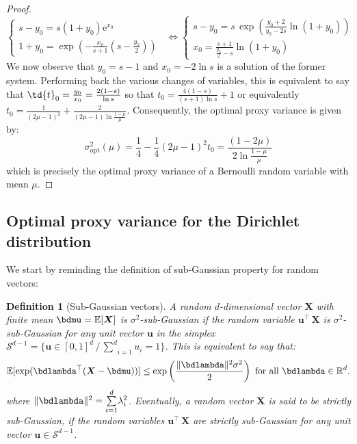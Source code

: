 \documentclass[15pt]{article}
\newcommand{\R}{\mathbb{R}}
\newcommand{\E}{\mathbb{E}}
\newcommand{\edr}{\mathrm{e}}
\def\E{\mathbb{E}}
\theoremstyle{plain}
\newtheorem{defi}{{Definition}}%
\begin{document}
\begin{proof}
\begin{equation*} 
\left\{\begin{array}{l}
 s-y_0=s(1+y_0)\edr^{x_0} \\  
 1+y_0=\exp\left(-\frac{x_0}{s+1}\left(s-\frac{y_0}{2}\right)\right)
\end{array}
\right. \,\,\,\Leftrightarrow  \left\{\begin{array}{l}
 s-y_0=s\,\exp\left(\frac{y_0+2}{y_0-2s}\ln(1+y_0)\right) \\  
 x_0=\frac{s+1}{\frac{y_0}{2}-s}\ln(1+y_0)
\end{array}
\right.
\end{equation*}
We now observe that $y_0=s-1$ and $x_0=-2\ln s$ is a solution of the former system. Performing back the various changes of variables, this is equivalent to say that $\td{t}_0=\frac{y_0}{x_0}= \frac{2(1-s)}{\ln s}$ so that $t_0=\frac{4(1-s)}{(s+1)\ln s}+1$ or equivalently $t_0=\frac{1}{(2\mu-1)^2}+\frac{2}{(2\mu-1)\ln\frac{1-\mu}{\mu}}$. Consequently, the optimal proxy variance is given by:
\begin{equation*} 
\sigma_{\text{opt}}^2(\mu)=\frac{1}{4}-\frac{1}{4}(2\mu-1)^2t_0=\frac{(1-2\mu)}{2\ln \frac{1-\mu}{\mu}}
\end{equation*}
which is precisely the optimal proxy variance of a Bernoulli random variable with mean $\mu$.
\end{proof}


\subsection{Optimal proxy variance for the Dirichlet distribution}


We start by reminding the definition of sub-Gaussian property for random vectors:

\begin{defi}[Sub-Gaussian vectors]\label{Def2}
A random $d$-dimensional vector $\boldsymbol{X}$ with finite  mean $\bdmu=\E[\boldsymbol{X}]$ is $\sigma^2${-sub-Gaussian} if the random variable $\boldsymbol{u}^\top \,\boldsymbol{X}$ is $\sigma^2$-{sub-Gaussian} for any unit vector $\boldsymbol{u}$ in the simplex $\mathcal{S}^{d-1}=\{\boldsymbol{u}\in [0,1]^d \,/\,\underset{i=1}{\overset{d}{\sum}}u_i=1\}$. This is equivalent to say that: 
\begin{align*}%
\E[\exp(\bdlambda^\top (\boldsymbol{X}-\bdmu))]\le\exp\left(\frac{\| \bdlambda\|^2\sigma^2}{2}\right)\,\,\text{for all } \bdlambda\in\R^d.
\end{align*}
where $\| \bdlambda\|^2=\underset{i=1}{\overset{d}{\sum}} \lambda_i^2$. Eventually, a random vector $\boldsymbol{X}$ is said to be strictly sub-Gaussian, if the random variables $\boldsymbol{u}^\top \,\boldsymbol{X}$ are strictly sub-Gaussian for any unit vector $\boldsymbol{u}\in \mathcal{S}^{d-1}$.
\end{defi}
%
\end{document}
